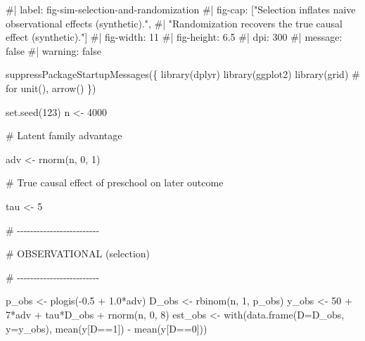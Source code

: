 \documentclass[
  letterpaper,
  DIV=11,
  numbers=noendperiod]{scrreprt}
\newenvironment{Shaded}{\begin{snugshade}}{\end{snugshade}}
\newcommand{\AttributeTok}[1]{\textcolor[rgb]{0.40,0.45,0.13}{#1}}
\newcommand{\CommentTok}[1]{\textcolor[rgb]{0.37,0.37,0.37}{#1}}
\newcommand{\DecValTok}[1]{\textcolor[rgb]{0.68,0.00,0.00}{#1}}
\newcommand{\FloatTok}[1]{\textcolor[rgb]{0.68,0.00,0.00}{#1}}
\newcommand{\FunctionTok}[1]{\textcolor[rgb]{0.28,0.35,0.67}{#1}}
\newcommand{\NormalTok}[1]{\textcolor[rgb]{0.00,0.23,0.31}{#1}}
\newcommand{\OtherTok}[1]{\textcolor[rgb]{0.00,0.23,0.31}{#1}}
\newcommand{\SpecialCharTok}[1]{\textcolor[rgb]{0.37,0.37,0.37}{#1}}
\begin{document}
\begin{Shaded}
\begin{Highlighting}[]
\CommentTok{\#| label: fig{-}sim{-}selection{-}and{-}randomization}
\CommentTok{\#| fig{-}cap: ["Selection inflates naive observational effects (synthetic).",}
\CommentTok{\#|           "Randomization recovers the true causal effect (synthetic)."]}
\CommentTok{\#| fig{-}width: 11}
\CommentTok{\#| fig{-}height: 6.5}
\CommentTok{\#| dpi: 300}
\CommentTok{\#| message: false}
\CommentTok{\#| warning: false}

\FunctionTok{suppressPackageStartupMessages}\NormalTok{(\{}
\FunctionTok{library}\NormalTok{(dplyr)}
\FunctionTok{library}\NormalTok{(ggplot2)}
\FunctionTok{library}\NormalTok{(grid)       }\CommentTok{\# for unit(), arrow()}
\NormalTok{\})}

\FunctionTok{set.seed}\NormalTok{(}\DecValTok{123}\NormalTok{)}
\NormalTok{n }\OtherTok{\textless{}{-}} \DecValTok{4000}

\CommentTok{\# Latent family advantage}

\NormalTok{adv }\OtherTok{\textless{}{-}} \FunctionTok{rnorm}\NormalTok{(n, }\DecValTok{0}\NormalTok{, }\DecValTok{1}\NormalTok{)}

\CommentTok{\# True causal effect of preschool on later outcome}

\NormalTok{tau }\OtherTok{\textless{}{-}} \DecValTok{5}

\CommentTok{\# {-}{-}{-}{-}{-}{-}{-}{-}{-}{-}{-}{-}{-}{-}{-}{-}{-}{-}{-}{-}{-}{-}{-}{-}{-}}

\CommentTok{\# OBSERVATIONAL (selection)}

\CommentTok{\# {-}{-}{-}{-}{-}{-}{-}{-}{-}{-}{-}{-}{-}{-}{-}{-}{-}{-}{-}{-}{-}{-}{-}{-}{-}}

\NormalTok{p\_obs }\OtherTok{\textless{}{-}} \FunctionTok{plogis}\NormalTok{(}\SpecialCharTok{{-}}\FloatTok{0.5} \SpecialCharTok{+} \FloatTok{1.0}\SpecialCharTok{*}\NormalTok{adv)}
\NormalTok{D\_obs }\OtherTok{\textless{}{-}} \FunctionTok{rbinom}\NormalTok{(n, }\DecValTok{1}\NormalTok{, p\_obs)}
\NormalTok{y\_obs }\OtherTok{\textless{}{-}} \DecValTok{50} \SpecialCharTok{+} \DecValTok{7}\SpecialCharTok{*}\NormalTok{adv }\SpecialCharTok{+}\NormalTok{ tau}\SpecialCharTok{*}\NormalTok{D\_obs }\SpecialCharTok{+} \FunctionTok{rnorm}\NormalTok{(n, }\DecValTok{0}\NormalTok{, }\DecValTok{8}\NormalTok{)}
\NormalTok{est\_obs }\OtherTok{\textless{}{-}} \FunctionTok{with}\NormalTok{(}\FunctionTok{data.frame}\NormalTok{(}\AttributeTok{D=}\NormalTok{D\_obs, }\AttributeTok{y=}\NormalTok{y\_obs), }\FunctionTok{mean}\NormalTok{(y[D}\SpecialCharTok{==}\DecValTok{1}\NormalTok{]) }\SpecialCharTok{{-}} \FunctionTok{mean}\NormalTok{(y[D}\SpecialCharTok{==}\DecValTok{0}\NormalTok{]))}


\end{Highlighting}
\end{Shaded}
\end{document}
